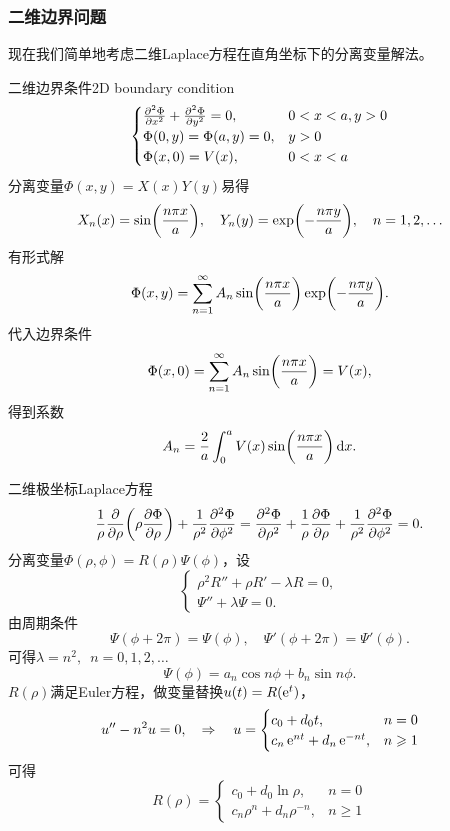 \subsubsection{二维边界问题}
现在我们简单地考虑二维Laplace方程在直角坐标下的分离变量解法。
\begin{example}{二维边界条件}{2D boundary condition}
    \begin{equation*}
        \begin{cases}
            \pv[2]\Phi x+\pv[2]\Phi y=0,&0<x<a,y>0\\
            \Phi(0,y)=\Phi(a,y)=0,&y>0\\
            \Phi(x, 0)=V(x),&0<x<a
        \end{cases}
    \end{equation*}
    分离变量$\Phi(x,y)=X(x)Y(y)$易得
    \[
        X_n(x)=\sin\biggkh{\frac{n\pi x}a},\quad Y_n(y)=\exp\biggkh{-\frac{n\pi y}a},\quad n=1,2,\ldots
    \]
    有形式解
    \begin{equation}
        \Phi(x,y)=\sum_{n=1}^\infty A_n\sin\biggkh{\frac{n\pi x}a}\exp\biggkh{-\frac{n\pi y}a}.
    \end{equation}
    代入边界条件
    \[
        \Phi(x,0)=\sum_{n=1}^\infty A_n\sin\biggkh{\frac{n\pi x}a}=V(x),
    \]
    得到系数
    \[
        A_n=\frac2a\int_0^aV(x)\sin\biggkh{\frac{n\pi x}a}\d x.
    \]
\end{example}
二维极坐标Laplace方程
\begin{equation}
    \frac1\rho\pp\rho\biggkh{\rho\pv\Phi\rho}+\frac1{\rho^2}\pv[2]\Phi\phi=\pv[2]\Phi\rho+\frac1\rho\pv\Phi\rho+\frac1{\rho^2}\pv[2]\Phi\phi=0.
\end{equation}
分离变量$\Phi(\rho,\phi)=R(\rho)\Psi(\phi)$，设
\[
    \begin{cases}
        \rho^2R''+\rho R'-\lambda R=0,\\
        \Psi''+\lambda\Psi=0.
    \end{cases}
\]
由周期条件
\[
    \Psi(\phi+2\pi)=\Psi(\phi),\quad\Psi'(\phi+2\pi)=\Psi'(\phi).
\]
可得$\lambda=n^2,\enspace n=0,1,2,\ldots$
\[
    \Psi(\phi)=a_n\cos n\phi+b_n\sin n\phi.
\]
$R(\rho)$满足Euler方程，做变量替换$u(t)=R(\e t)$，
\[
    u''-n^2u=0,\thus u=
    \begin{cases}
        c_0+d_0t,&n=0\\
        c_n\e{nt}+d_n\e{-nt},&n\geqslant 1
    \end{cases}
\]
可得
\[
    R(\rho)=
    \begin{cases}
        c_0+d_0\ln\rho,&n=0\\
        c_n\rho^n+d_n\rho^{-n},&n\geqslant 1
    \end{cases}
\]
